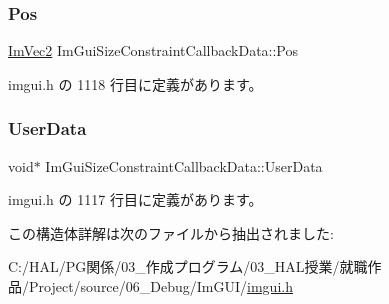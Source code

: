 \subsubsection{\texorpdfstring{Pos}{Pos}}
{\footnotesize\ttfamily \mbox{\hyperlink{struct_im_vec2}{Im\+Vec2}} Im\+Gui\+Size\+Constraint\+Callback\+Data\+::\+Pos}



 imgui.\+h の 1118 行目に定義があります。

\mbox{\label{struct_im_gui_size_constraint_callback_data_a3b2fb1bd849f82edc78377f361433eac}} 
\subsubsection{\texorpdfstring{User\+Data}{UserData}}
{\footnotesize\ttfamily void$\ast$ Im\+Gui\+Size\+Constraint\+Callback\+Data\+::\+User\+Data}



 imgui.\+h の 1117 行目に定義があります。



この構造体詳解は次のファイルから抽出されました\+:\begin{DoxyCompactItemize}
\item 
C\+:/\+H\+A\+L/\+P\+G関係/03\+\_\+作成プログラム/03\+\_\+\+H\+A\+L授業/就職作品/\+Project/source/06\+\_\+\+Debug/\+Im\+G\+U\+I/\mbox{\hyperlink{imgui_8h}{imgui.\+h}}\end{DoxyCompactItemize}
